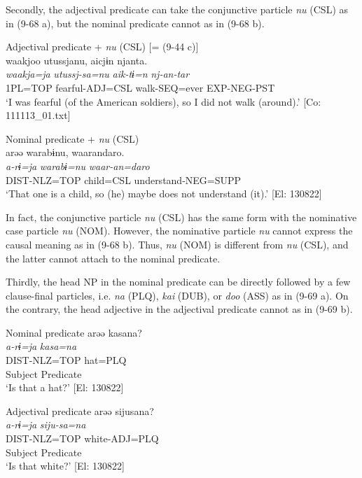Secondly, the adjectival predicate can take the conjunctive particle \textit{nu} (CSL) as in (9-68 a), but the nominal predicate cannot as in (9-68 b).

\ea   \label{ex:9.68}
\ea Adjectival predicate + \textit{nu} (CSL) [= (9-44 c)]\\
 \glll  waakjoo  utussjanu,  aicjɨn  njanta.\\
    \textit{waakja=ja}  \textit{utussj-sa=nu}  \textit{aik-tɨ=n}  \textit{nj-an-tar}\\
    1PL=TOP  fearful-ADJ=CSL  walk-SEQ=ever  EXP-NEG-PST\\
    \glt     ‘I was fearful (of the American soldiers), so I did not walk (around).’ [Co: 111113\_01.txt]

\ex Nominal predicate + \textit{nu} (CSL)\\
 \glll  *arəə  warabɨnu,  waarandaro.\\
    \textit{a-rɨ=ja}  \textit{warabɨ=nu}  \textit{waar-an=daro}\\
    DIST-NLZ=TOP  child=CSL  understand-NEG=SUPP\\
     ‘That one is a child, so (he) maybe does not understand (it).’ [El: 130822]
    \z
\z

In fact, the conjunctive particle \textit{nu} (CSL) has the same form with the nominative case particle \textit{nu} (NOM). However, the nominative particle \textit{nu} cannot express the causal meaning as in (9-68 b). Thus, \textit{nu} (NOM) is different from \textit{nu} (CSL), and the latter cannot attach to the nominal predicate.

Thirdly, the head NP in the nominal predicate can be directly followed by a few clause-final particles, i.e. \textit{na} (PLQ), \textit{kai} (DUB), or \textit{doo} (ASS) as in (9-69 a). On the contrary, the head adjective in the adjectival predicate cannot as in (9-69 b).

\ea \label{ex:9.69}
\exi{} Nominal predicate 
\ea %
 \gllll  arəə  kasana?\\
      \textit{a-rɨ=ja}  \textit{kasa=na}\\
      DIST-NLZ=TOP  hat=PLQ\\
      Subject  Predicate\\
      \glt       ‘Is that a hat?’ [El: 130822]

\exi{} Adjectival predicate
\ex \label{ex:9.69b} %
    \gllll  *arəə  sijusana?\\
      \textit{a-rɨ=ja}  \textit{siju-sa=na}\\
      DIST-NLZ=TOP  white-ADJ=PLQ\\
      Subject  Predicate\\
       ‘Is that white?’ [El: 130822]


